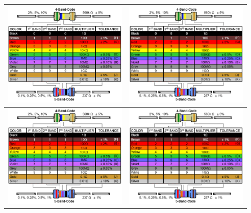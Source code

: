\documentclass[oneside]{article}
\begin{document}
    \begin{tabularx}{\linewidth}{| >{\centering\arraybackslash}X | >{\centering\arraybackslash}X |}
        \hline
        \includegraphics[height=5cm]{Extras/resistor_chart} & \includegraphics[height=5cm]{Extras/resistor_chart}\\\hline
        \includegraphics[height=5cm]{Extras/resistor_chart} & \includegraphics[height=5cm]{Extras/resistor_chart}\\\hline

\end{tabularx}
\end{document}
